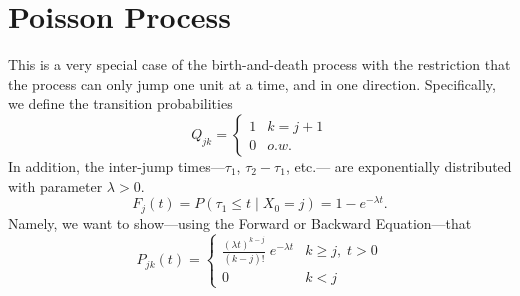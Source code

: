 \documentclass[a4paper,11pt]{scrartcl}
\begin{document}
\section{Poisson Process}

This is a very special case of the birth-and-death process
with the restriction that the process can only jump one unit at a 
time, and in one direction. Specifically, we define the transition
probabilities
   \[ Q_{jk} = \begin{cases} 1 & k = j+1 \\ 0 & o.w. \end{cases} \]
In addition, the inter-jump times---$\tau_1$, $\tau_2 - \tau_1$, etc.---
are exponentially distributed with parameter $\lambda > 0$.
   \[ F_j(t) = P(\tau_1 \leq t \; | \; X_0 = j) = 1- e^{-\lambda t}.\]
Namely, we want to show---using the Forward or Backward Equation---that
   \[P_{jk}(t) = \begin{cases} \frac{(\lambda t)^{k-j}}{(k-j)!} \;
      e^{-\lambda t} & k \geq j, \; t > 0 \\ 0 & k < j \end{cases} \]
\end{document}
